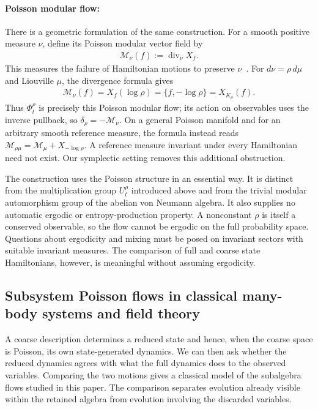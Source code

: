 \documentclass[a4paper,11pt]{article}
\theoremstyle{definition}
\begin{document}
\paragraph{Poisson modular flow:}
There is a geometric formulation of the same construction. For a smooth positive measure $\nu$, define its Poisson modular vector field by
\begin{align}
    \mathcal M_\nu(f):=\operatorname{div}_\nu X_f.
\end{align}
This measures the failure of Hamiltonian motions to preserve $\nu$~\cite{Weinstein1997}. For $d\nu=\rho\,d\mu$ and Liouville $\mu$, the divergence formula gives
\begin{align}
    \mathcal M_\nu(f)=X_f(\log\rho)
    =\{f,-\log\rho\}=X_{K_\rho}(f).
\end{align}
Thus $\Phi_t^\rho$ is precisely this Poisson modular flow; its action on observables uses the inverse pullback, so $\delta_\rho=-\mathcal M_\nu$. On a general Poisson manifold and for an arbitrary smooth reference measure, the formula instead reads $\mathcal M_{\rho\mu}=\mathcal M_\mu+X_{-\log\rho}$. A reference measure invariant under every Hamiltonian need not exist. Our symplectic setting removes this additional obstruction.

The construction uses the Poisson structure in an essential way. It is distinct from the multiplication group $U_t^\rho$ introduced above and from the trivial modular automorphism group of the abelian von Neumann algebra. It also supplies no automatic ergodic or entropy-production property. A nonconstant $\rho$ is itself a conserved observable, so the flow cannot be ergodic on the full probability space. Questions about ergodicity and mixing must be posed on invariant sectors with suitable invariant measures. The comparison of full and coarse state Hamiltonians, however, is meaningful without assuming ergodicity.

\subsection{Subsystem Poisson flows in classical many-body systems and field theory}
\label{subsec:classical-subalgebra-Hamiltonian}

A coarse description determines a reduced state and hence, when the coarse space is Poisson, its own state-generated dynamics. We can then ask whether the reduced dynamics agrees with what the full dynamics does to the observed variables. Comparing the two motions gives a classical model of the subalgebra flows studied in this paper. The comparison separates evolution already visible within the retained algebra from evolution involving the discarded variables.
\end{document}
